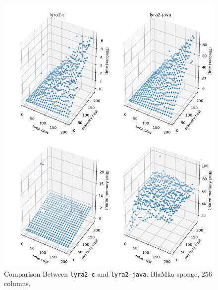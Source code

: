 \begin{figure}[p]
    \centering
    \includegraphics[width=\linewidth,keepaspectratio]{figures/tcost_mcost_blamka_256}
    \caption{Comparison Between \texttt{lyra2-c} and \texttt{lyra2-java}: BlaMka sponge, 256 columns. }
    \label{figure:tcost_mcost_blamka_256}
\end{figure}

